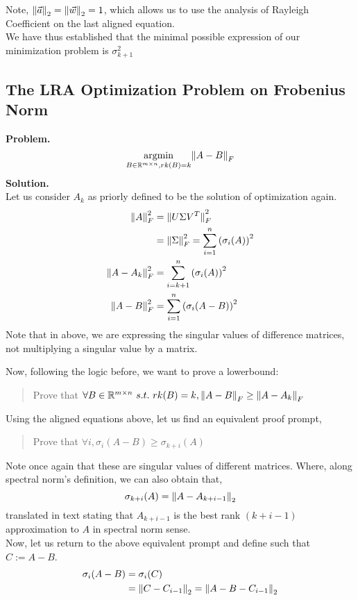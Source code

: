Note, $\pnorm{\vec{a}}{2} = \pnorm{\vec{w}}{2} = 1$, which allows us to use the analysis of Rayleigh Coefficient on the last aligned equation. \\
We have thus established that the minimal possible expression of our minimization problem is $\sigma_{k + 1}^2$

\subsection{The LRA Optimization Problem on Frobenius Norm}{}
\textbf{Problem.}
\[
    \underset{B \in \R^{m \times n}, rk(B) = k}{\text{argmin}} \pnorm{A - B}{F}
\]
\textbf{Solution.} \\
Let us consider $A_k$ as priorly defined to be the solution of optimization again.
\begin{align*}
    \pnorm[2]{A}{F} &= \pnorm[2]{U \Sigma V^T}{F} \\
    &= \pnorm[2]{\Sigma}{F} = \sum_{i = 1}^n {(\sigma_i(A))}^2 \\
    \pnorm[2]{A - A_k}{F} &= \sum_{i = k + 1}^n {(\sigma_i(A))}^2 \\
    \pnorm[2]{A - B}{F} &= \sum_{i = 1}^n {(\sigma_i(A - B))}^2
\end{align*}
Note that in above, we are expressing the singular values of difference matrices, not multiplying a singular value by a matrix.
\par
Now, following the logic before, we want to prove a lowerbound:
\begin{quote}
    Prove that $\forall B \in \R^{m \times n}\ s.t.\ rk(B) = k, \pnorm{A - B}{F} \geq \pnorm{A - A_k}{F}$
\end{quote}
Using the aligned equations above, let us find an equivalent proof prompt,
\begin{quote}
    Prove that $\forall i, \sigma_i (A - B) \geq \sigma_{k + i}(A)$
\end{quote}
Note once again that these are singular values of different matrices.
Where, along spectral norm's definition, we can also obtain that,
\[
    \sigma_{k + i}(A) = \pnorm{A - A_{k + i - 1}}{2}
\]
translated in text stating that $A_{k + i - 1}$ is the best rank $(k + i - 1)$ approximation to $A$ in spectral norm sense. \\
Now, let us return to the above equivalent prompt and define such that $C := A - B$.
\begin{align*}
    \sigma_i (A - B)
    &= \sigma_i (C) \\
    &= \pnorm{C - C_{i - 1}}{2} = \pnorm{A - B - C_{i - 1}}{2}
\end{align*}
